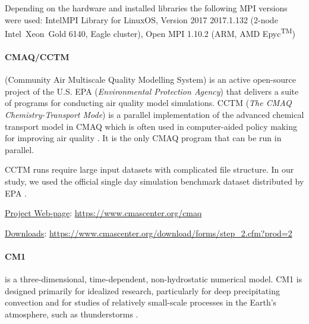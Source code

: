 Depending on the hardware and installed libraries the following MPI versions were used: Intel\textregistered MPI Library for Linux\textregistered OS, Version 2017 2017.1.132 (2-node Intel\textregistered\ Xeon\textregistered\ Gold 6140, Eagle cluster), Open MPI 1.10.2 (ARM, AMD Epyc\textsuperscript{TM})
\fi



\paragraph{CMAQ/CCTM}
(Community Air Multiscale Quality Modelling System) is an active open-source project of the U.S. EPA (\textit{Environmental Protection Agency}) %
that delivers a suite of programs for conducting air quality model simulations. %
CCTM (\textit{The CMAQ Chemistry-Transport Mode}) is a parallel implementation of the advanced chemical transport model in CMAQ
which is often used in computer-aided policy making for improving air quality \cite{CHEMEL2014410}.
It is the only CMAQ program that can be run in parallel.

CCTM runs require large input datasets with complicated file structure.
In our study, we used the official single day simulation benchmark dataset distributed by EPA \cite{EPA}.

\underline{Project Web-page}: \url{https://www.cmascenter.org/cmaq}

\underline{Downloads}: \url{https://www.cmascenter.org/download/forms/step_2.cfm?prod=2}

\iffalse
\underline{Use case description}

The following libraries have to be installed prior to building CCTM: \textit{NetCDF, NetCDF Fortran, IOAPI}. When installed, the following scripts could have been initiated to finish the installation and run the application itself: \textit{config\_cmaq.csh, bldit\_project.csh, bldit\_cctm.csh, run\_cct.csh}.
Benchmark data have been downloaded based on the information provided by EPA for a single day \cite{EPA}.
\fi

\paragraph{CM1} is a three-dimensional, time-dependent, non-hydrostatic numerical model. %
CM1 is designed primarily for idealized research, particularly for deep precipitating convection and for studies of relatively small-scale processes in the Earth's atmosphere, such as thunderstorms \cite{CM1}.

